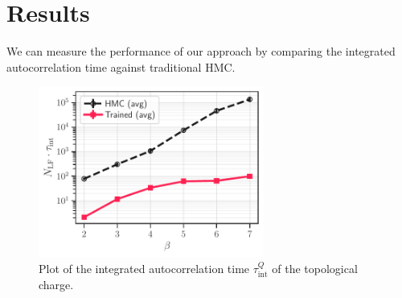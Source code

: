 \documentclass[a4paper,11pt]{article}
\begin{document}
\section{\label{sec:results}Results}
We can measure the performance of our approach by comparing the integrated
autocorrelation time against traditional HMC.
%
\begin{figure}[htpb]
    \centering
    \includegraphics[width=0.66\textwidth]{assets/autocorr_vs_beta.pdf}
    \caption{\label{fig:autocorr} Plot of the integrated autocorrelation time
    \(\tau_{\mathrm{int}}^{Q}\) of the topological charge.}
\end{figure}
%





\end{document}
